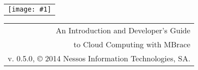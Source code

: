 \documentclass[9pt,a4paper]{article}
\makeatletter
\newcommand{\version}{0.5.0}
\newcommand{\showheader}[1]{%
%
\begin{center}
\begin{tabular}{@{} l}
\texttt{[image: \#1]}
\end{tabular}%
%
\hspace{3em}
%
\begin{tabular}{ @{\hspace{\stretch{5}}} r }
{\huge An Introduction and Developer's Guide}\\[1.2em]
{\huge to Cloud Computing with \TitularMbrace}\\[3em]
{{v\mbox{.} \version},\hspace{1em}%
\copyright{} 2014 Nessos Information Technologies, SA.}
\end{tabular}%
\end{center}%
}
\newcommand{\TitularMbrace}{MBrace}
\makeatother
\begin{document}
%
%
\showheader{mbrace.png}
%
%

%

%

%

%
\appendix
%

%

\end{document}
